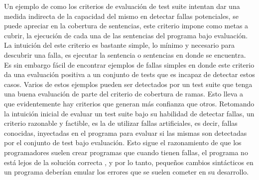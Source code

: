 Un ejemplo de como los criterios de evaluaci\'on de test suite intentan dar una medida indirecta de la capacidad del mismo en detectar fallas potenciales, se puede apreciar en la cobertura de sentencias, este criterio impone como metas a cubrir, la ejecuci\'on de cada una de las sentencias del programa bajo evaluaci\'on. La intuici\'on del este criterio es bastante simple, lo m\'inimo y necesario para descubrir una falla, es ejecutar la sentencia o sentencias en donde se encuentra. Es sin embargo f\'acil de encontrar ejemplos de fallas simples en donde este criterio da una evaluaci\'on positiva a un conjunto de tests que es incapaz de detectar estos casos. Varios de estos ejemplos pueden ser detectados por un test suite que tenga una buena evaluaci\'on de parte del criterio de cobertura de ramas. Esto lleva a que evidentemente hay criterios que generan m\'as confianza que otros. Retomando la intuici\'on inicial de evaluar un test suite bajo su habilidad de detectar fallas, un criterio razonable y factible, es la de utilizar fallas artificiales, es decir, fallas conocidas, inyectadas en el programa para evaluar si las mismas son detectadas por el conjunto de test bajo evaluaci\'on. Esto sigue el razonamiento de que los programadores suelen crear programas que cuando tienen fallas, el programa no est\'a lejos de la soluci\'on correcta \cite{bibliography.mutation.DeMillo}, y por lo tanto, peque\~nos cambios sint\'acticos en un programa deber\'ian emular los errores que se suelen cometer en su desarrollo.

